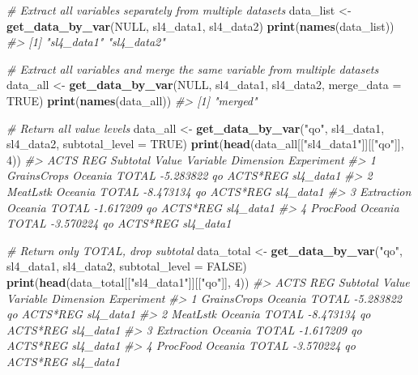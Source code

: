 \documentclass[
]{article}
\newenvironment{Shaded}{\begin{snugshade}}{\end{snugshade}}
\newcommand{\AttributeTok}[1]{\textcolor[rgb]{0.13,0.29,0.53}{#1}}
\newcommand{\CommentTok}[1]{\textcolor[rgb]{0.56,0.35,0.01}{\textit{#1}}}
\newcommand{\ConstantTok}[1]{\textcolor[rgb]{0.56,0.35,0.01}{#1}}
\newcommand{\DecValTok}[1]{\textcolor[rgb]{0.00,0.00,0.81}{#1}}
\newcommand{\FunctionTok}[1]{\textcolor[rgb]{0.13,0.29,0.53}{\textbf{#1}}}
\newcommand{\NormalTok}[1]{#1}
\newcommand{\OtherTok}[1]{\textcolor[rgb]{0.56,0.35,0.01}{#1}}
\newcommand{\StringTok}[1]{\textcolor[rgb]{0.31,0.60,0.02}{#1}}
\begin{document}
\begin{Shaded}
\begin{Highlighting}[]
\CommentTok{\# Extract all variables separately from multiple datasets}
\NormalTok{data\_list }\OtherTok{\textless{}{-}} \FunctionTok{get\_data\_by\_var}\NormalTok{(}\ConstantTok{NULL}\NormalTok{, sl4\_data1, sl4\_data2)}
\FunctionTok{print}\NormalTok{(}\FunctionTok{names}\NormalTok{(data\_list))}
\CommentTok{\#\textgreater{} [1] "sl4\_data1" "sl4\_data2"}

\CommentTok{\# Extract all variables and merge the same variable from multiple datasets}
\NormalTok{data\_all }\OtherTok{\textless{}{-}} \FunctionTok{get\_data\_by\_var}\NormalTok{(}\ConstantTok{NULL}\NormalTok{, sl4\_data1, sl4\_data2, }\AttributeTok{merge\_data =} \ConstantTok{TRUE}\NormalTok{)}
\FunctionTok{print}\NormalTok{(}\FunctionTok{names}\NormalTok{(data\_all))}
\CommentTok{\#\textgreater{} [1] "merged"}

\CommentTok{\# Return all value levels}
\NormalTok{data\_all }\OtherTok{\textless{}{-}} \FunctionTok{get\_data\_by\_var}\NormalTok{(}\StringTok{"qo"}\NormalTok{, sl4\_data1, sl4\_data2, }\AttributeTok{subtotal\_level =} \ConstantTok{TRUE}\NormalTok{)}
\FunctionTok{print}\NormalTok{(}\FunctionTok{head}\NormalTok{(data\_all[[}\StringTok{"sl4\_data1"}\NormalTok{]][[}\StringTok{"qo"}\NormalTok{]], }\DecValTok{4}\NormalTok{))}
\CommentTok{\#\textgreater{}          ACTS     REG Subtotal     Value Variable Dimension Experiment}
\CommentTok{\#\textgreater{} 1 GrainsCrops Oceania    TOTAL {-}5.283822       qo  ACTS*REG  sl4\_data1}
\CommentTok{\#\textgreater{} 2    MeatLstk Oceania    TOTAL {-}8.473134       qo  ACTS*REG  sl4\_data1}
\CommentTok{\#\textgreater{} 3  Extraction Oceania    TOTAL {-}1.617209       qo  ACTS*REG  sl4\_data1}
\CommentTok{\#\textgreater{} 4    ProcFood Oceania    TOTAL {-}3.570224       qo  ACTS*REG  sl4\_data1}

\CommentTok{\# Return only TOTAL, drop subtotal}
\NormalTok{data\_total }\OtherTok{\textless{}{-}} \FunctionTok{get\_data\_by\_var}\NormalTok{(}\StringTok{"qo"}\NormalTok{, sl4\_data1, sl4\_data2, }\AttributeTok{subtotal\_level =} \ConstantTok{FALSE}\NormalTok{)}
\FunctionTok{print}\NormalTok{(}\FunctionTok{head}\NormalTok{(data\_total[[}\StringTok{"sl4\_data1"}\NormalTok{]][[}\StringTok{"qo"}\NormalTok{]], }\DecValTok{4}\NormalTok{))}
\CommentTok{\#\textgreater{}          ACTS     REG Subtotal     Value Variable Dimension Experiment}
\CommentTok{\#\textgreater{} 1 GrainsCrops Oceania    TOTAL {-}5.283822       qo  ACTS*REG  sl4\_data1}
\CommentTok{\#\textgreater{} 2    MeatLstk Oceania    TOTAL {-}8.473134       qo  ACTS*REG  sl4\_data1}
\CommentTok{\#\textgreater{} 3  Extraction Oceania    TOTAL {-}1.617209       qo  ACTS*REG  sl4\_data1}
\CommentTok{\#\textgreater{} 4    ProcFood Oceania    TOTAL {-}3.570224       qo  ACTS*REG  sl4\_data1}


\end{Highlighting}
\end{Shaded}
\end{document}
